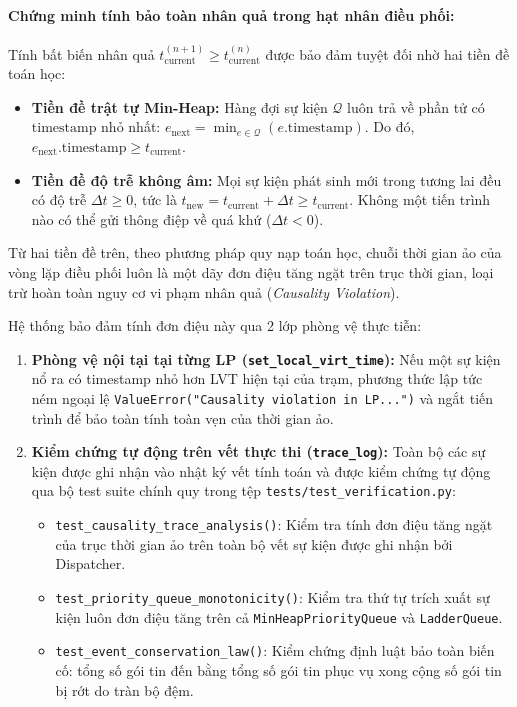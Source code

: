 \paragraph{Chứng minh tính bảo toàn nhân quả trong hạt nhân điều phối:}
Tính bất biến nhân quả $t_{\text{current}}^{(n+1)} \ge t_{\text{current}}^{(n)}$ được bảo đảm tuyệt đối nhờ hai tiền đề toán học:
\begin{itemize}[leftmargin=1.5em, itemsep=2pt]
\item \textbf{Tiền đề trật tự Min-Heap:} Hàng đợi sự kiện $\mathcal{Q}$ luôn trả về phần tử có $\text{timestamp}$ nhỏ nhất: $e_{\text{next}} = \min_{e \in \mathcal{Q}}(e.\text{timestamp})$. Do đó, $e_{\text{next}}.\text{timestamp} \ge t_{\text{current}}$.
\item \textbf{Tiền đề độ trễ không âm:} Mọi sự kiện phát sinh mới trong tương lai đều có độ trễ $\Delta t \ge 0$, tức là $t_{\text{new}} = t_{\text{current}} + \Delta t \ge t_{\text{current}}$. Không một tiến trình nào có thể gửi thông điệp về quá khứ ($\Delta t < 0$).
\end{itemize}
Từ hai tiền đề trên, theo phương pháp quy nạp toán học, chuỗi thời gian ảo của vòng lặp điều phối luôn là một dãy đơn điệu tăng ngặt trên trục thời gian, loại trừ hoàn toàn nguy cơ vi phạm nhân quả (\textit{Causality Violation}).

Hệ thống bảo đảm tính đơn điệu này qua 2 lớp phòng vệ thực tiễn:
\begin{enumerate}[leftmargin=2em, itemsep=3pt]
\item \textbf{Phòng vệ nội tại tại từng LP (\texttt{set\_local\_virt\_time}):} Nếu một sự kiện nổ ra có timestamp nhỏ hơn LVT hiện tại của trạm, phương thức lập tức ném ngoại lệ \texttt{ValueError("Causality violation in LP...")} và ngắt tiến trình để bảo toàn tính toàn vẹn của thời gian ảo.
\item \textbf{Kiểm chứng tự động trên vết thực thi (\texttt{trace\_log}):} Toàn bộ các sự kiện được ghi nhận vào nhật ký vết tính toán và được kiểm chứng tự động qua bộ test suite chính quy trong tệp \texttt{tests/test\_verification.py}:
\begin{itemize}[leftmargin=1.5em, itemsep=2pt]
\item \texttt{test\_causality\_trace\_analysis()}: Kiểm tra tính đơn điệu tăng ngặt của trục thời gian ảo trên toàn bộ vết sự kiện được ghi nhận bởi Dispatcher.
\item \texttt{test\_priority\_queue\_monotonicity()}: Kiểm tra thứ tự trích xuất sự kiện luôn đơn điệu tăng trên cả \texttt{MinHeapPriorityQueue} và \texttt{LadderQueue}.
\item \texttt{test\_event\_conservation\_law()}: Kiểm chứng định luật bảo toàn biến cố: tổng số gói tin đến bằng tổng số gói tin phục vụ xong cộng số gói tin bị rớt do tràn bộ đệm.
\end{itemize}
\end{enumerate}



